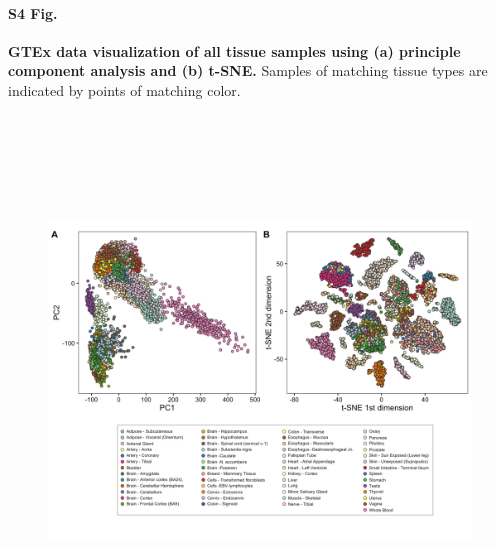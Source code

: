 \documentclass[10pt,letterpaper]{article}
\begin{document}
\paragraph*{S4 Fig.}

\label{figS4}
{\bf GTEx data visualization of all tissue samples using (a) principle component analysis and (b) t-SNE.}
Samples of matching tissue types are indicated by points of matching color.
\begin{figure}[ht]
\centering
\includegraphics[height=5.5in, width=6.5in]{../../src/figure/gtex-pca-vs-tsne.Rmd/gtex-with-legend.jpeg}
\end{figure}
\end{document}
